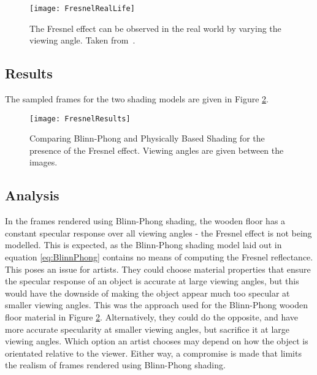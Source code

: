 \begin{figure}[h]
	\centering
	\texttt{[image: FresnelRealLife]}
	\caption{The Fresnel effect can be observed in the real world by varying the viewing angle. Taken from~\cite{MarkusLecture}.}
	\label{fig:FresnelRealLife}
\end{figure}

\subsection{Results}

The sampled frames for the two shading models are given in Figure \ref{fig:FresnelResults}.

\begin{figure}[h]
	\centering
	\texttt{[image: FresnelResults]}
	\caption{Comparing Blinn-Phong and Physically Based Shading for the presence of the Fresnel effect. Viewing angles are given between the images.}
	\label{fig:FresnelResults}
\end{figure}

\subsection{Analysis}

In the frames rendered using Blinn-Phong shading, the wooden floor has a constant specular response over all viewing angles - the Fresnel effect is not being modelled. This is expected, as the Blinn-Phong shading model laid out in equation \ref{eq:BlinnPhong} contains no means of computing the Fresnel reflectance. This poses an issue for artists. They could choose material properties that ensure the specular response of an object is accurate at large viewing angles, but this would have the downside of making the object appear much too specular at smaller viewing angles. This was the approach used for the Blinn-Phong wooden floor material in Figure \ref{fig:FresnelResults}. Alternatively, they could do the opposite, and have more accurate specularity at smaller viewing angles, but sacrifice it at large viewing angles. Which option an artist chooses may depend on how the object is orientated relative to the viewer. Either way, a compromise is made that limits the realism of frames rendered using Blinn-Phong shading.

